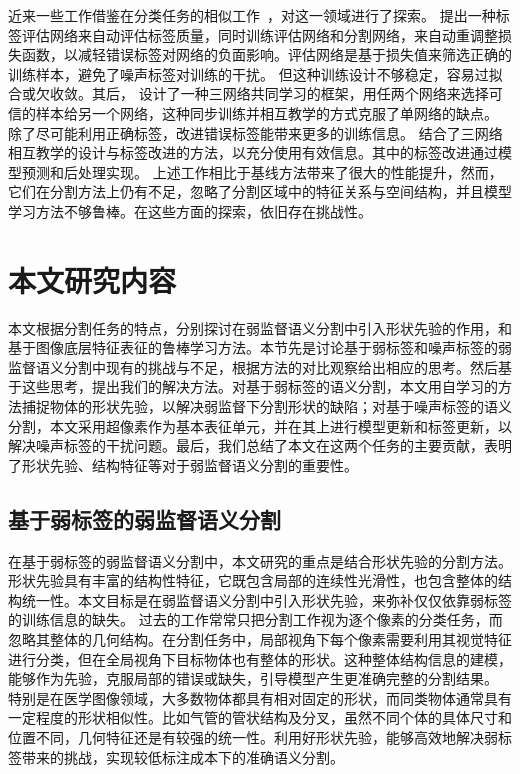 近来一些工作借鉴在分类任务的相似工作~\citep{arpit2017closer,Han2018CoteachingRT,Wei2020CombatingNL}，对这一领域进行了探索。
\citet{Zhu2019PickandLearnAQ} 提出一种标签评估网络来自动评估标签质量，同时训练评估网络和分割网络，来自动重调整损失函数，以减轻错误标签对网络的负面影响。评估网络是基于损失值来筛选正确的训练样本，避免了噪声标签对训练的干扰。
但这种训练设计不够稳定，容易过拟合或欠收敛。其后，\citet{Zhang2020RobustMI} 设计了一种三网络共同学习的框架，用任两个网络来选择可信的样本给另一个网络，这种同步训练并相互教学的方式克服了单网络的缺点。
除了尽可能利用正确标签，改进错误标签能带来更多的训练信息。\citet{Xue2020CascadedRL} 结合了三网络相互教学的设计与标签改进的方法，以充分使用有效信息。其中的标签改进通过模型预测和后处理实现。
上述工作相比于基线方法带来了很大的性能提升，然而，它们在分割方法上仍有不足，忽略了分割区域中的特征关系与空间结构，并且模型学习方法不够鲁棒。在这些方面的探索，依旧存在挑战性。


\section{本文研究内容}
本文根据分割任务的特点，分别探讨在弱监督语义分割中引入形状先验的作用，和基于图像底层特征表征的鲁棒学习方法。本节先是讨论基于弱标签和噪声标签的弱监督语义分割中现有的挑战与不足，根据方法的对比观察给出相应的思考。然后基于这些思考，提出我们的解决方法。对基于弱标签的语义分割，本文用自学习的方法捕捉物体的形状先验，以解决弱监督下分割形状的缺陷；对基于噪声标签的语义分割，本文采用超像素作为基本表征单元，并在其上进行模型更新和标签更新，以解决噪声标签的干扰问题。最后，我们总结了本文在这两个任务的主要贡献，表明了形状先验、结构特征等对于弱监督语义分割的重要性。

\subsection{基于弱标签的弱监督语义分割}
在基于弱标签的弱监督语义分割中，本文研究的重点是结合形状先验的分割方法。形状先验具有丰富的结构性特征，它既包含局部的连续性光滑性，也包含整体的结构统一性。本文目标是在弱监督语义分割中引入形状先验，来弥补仅仅依靠弱标签的训练信息的缺失。
过去的工作常常只把分割工作视为逐个像素的分类任务，而忽略其整体的几何结构。在分割任务中，局部视角下每个像素需要利用其视觉特征进行分类，但在全局视角下目标物体也有整体的形状。这种整体结构信息的建模，能够作为先验，克服局部的错误或缺失，引导模型产生更准确完整的分割结果。
特别是在医学图像领域，大多数物体都具有相对固定的形状，而同类物体通常具有一定程度的形状相似性。比如气管的管状结构及分叉，虽然不同个体的具体尺寸和位置不同，几何特征还是有较强的统一性。利用好形状先验，能够高效地解决弱标签带来的挑战，实现较低标注成本下的准确语义分割。

